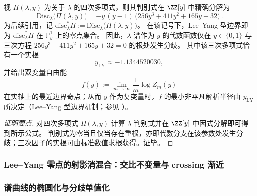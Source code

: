 

\begin{conclusion}\label{con:xi-terminal-zm-discriminant-leyang}
视 \(\Pi(\lambda,y)\) 为关于 \(\lambda\) 的四次多项式，则其判别式在 \(\ZZ[y]\) 中精确分解为
\[
\boxed{\;
\mathrm{Disc}_{\lambda}\bigl(\Pi(\lambda,y)\bigr)
=-y\,(y-1)\,\bigl(256y^3+411y^2+165y+32\bigr)\; }.
\]
为后续引用，记
\(
\mathrm{disc}^{\ast}_{\lambda}\Pi:=\mathrm{Disc}_{\lambda}\bigl(\Pi(\lambda,y)\bigr)
\)。
在该记号下，Lee--Yang 型边界即为 \(\mathrm{disc}^{\ast}_{\lambda}\Pi\) 在 \(\mathbb P^1_y\) 上的零点集合。
因此，\(\lambda\)-谱作为 \(y\) 的代数函数仅在
\(
y\in\{0,1\}
\)
与三次方程
\(
256y^3+411y^2+165y+32=0
\)
的根处发生分歧。
其中该三次多项式恰有一个实根
\[
y_{\mathrm{LY}}\approx-1.1344520030,
\]
并给出双变量自由能
\[
f(y):=\lim_{m\to\infty}\frac{1}{m}\log Z_m(y)
\]
在实轴上的最近边界奇点；从而 \(y\) 作为复变量时，\(f\) 的最小非平凡解析半径由 \(y_{\mathrm{LY}}\) 所决定（Lee--Yang 型边界机制；参见 \cite{XuZamolodchikov2022IsingYangLee}）。
\end{conclusion}
\begin{proof}[证明要点]
对四次多项式 \(\Pi(\lambda,y)\) 计算 \(\lambda\)-判别式并在 \(\ZZ[y]\) 中因式分解即可得到所示公式。
判别式为零当且仅当存在重根，亦即代数分支在该参数处发生分歧；三次因子的实根可由标准数值求根获得。证毕。
\end{proof}

\subsubsection{Lee--Yang 零点的射影消混合：交比不变量与 crossing 渐近}\label{subsubsec:xi-leyang-projective-demixing-crossing}


\subsubsection{谱曲线的椭圆化与分歧单值化}\label{subsubsec:xi-spectral-elliptic-ramification-monodromy}


















